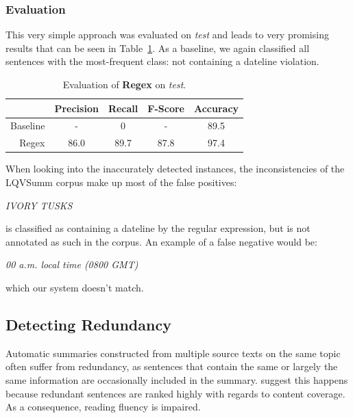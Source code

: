 \documentclass[a4paper,10pt]{scrartcl}
\theoremstyle{style}
\begin{document}
\subsubsection{Evaluation}
This very simple approach was evaluated on \textit{test} and leads to very promising results that can be seen in Table~\ref{eval_regex}. As a baseline, we again classified all sentences with the most-frequent class: not containing a dateline violation.

\begin{table}
\begin{center}
\begin{tabular}{|r|c|c|c|c|}
  \hline
  & \textbf{Precision} & \textbf{Recall} & \textbf{F-Score} & \textbf{Accuracy}\\
  \hline
  Baseline & - & 0 & - & 89.5\\
  \hline
  Regex & 86.0 & 89.7 & 87.8 & 97.4\\
  \hline
  \end{tabular}
\end{center}
\caption{Evaluation of \textbf{Regex} on \textit{test}.}
\label{eval_regex}
\end{table}


When looking into the inaccurately detected instances, the inconsistencies of the LQVSumm corpus make up most of the false positives:

\textit{IVORY TUSKS}

is classified as containing a dateline by the regular expression, but is not annotated as such in the corpus. An example of a false negative would be:

\textit{00 a.m. local time (0800 GMT)}

which our system doesn't match.

\newpage
\subsection{Detecting Redundancy}
\label{redundancy}

Automatic summaries constructed from multiple source texts on the same topic often suffer from redundancy, as sentences that contain the same or largely the same information are occasionally included in the summary. \cite{friedrichlqvsumm} suggest this happens because redundant sentences are ranked highly with regards to content coverage.
As a consequence, reading fluency is impaired.
\end{document}
